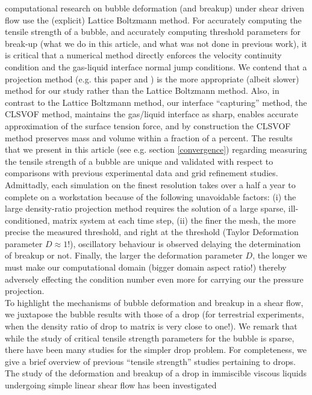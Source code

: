 \documentclass{elsarticle}
\begin{document}
{computational research on bubble deformation (and breakup) under shear driven 
flow\cite{WeiQiaXu12,WanShiZha15,AAMM-16-2}  use the (explicit) Lattice Boltzmann method.  For accurately computing the tensile strength of a bubble, and accurately computing threshold parameters for break-up (what we do in this article, and what was not done in previous work), it is critical that a numerical method directly enforces the velocity continuity condition and the gas-liquid interface normal jump conditions.  We contend that a projection method (e.g. this paper and \cite{zhang2021three,zhang2022three,OhtSus12}) is the more appropriate (albeit slower) method for our study rather than the Lattice Boltzmann method.  Also, in contrast to the Lattice Boltzmann method, our interface ``capturing'' method, the CLSVOF method\cite{SusPuc00,SusSmiHusOhtZhi07},  maintains the gas/liquid interface as sharp, enables accurate approximation of the surface tension force,  and by construction the CLSVOF method preserves mass and volume within a fraction of a percent. The results that we present in this article (see e.g. section \ref{convergence}) regarding measuring the tensile strength of a bubble are unique and validated with respect to comparisons with previous experimental data and grid refinement studies.  Admittadly, each simulation on the finest resolution takes over a half a year to complete on a workstation because of the following unavoidable factors: (i) the large density-ratio projection method requires the solution of a large sparse, ill-conditioned, matrix system at each time step, (ii) the finer the mesh, the more precise the measured threshold, and right at the threshold (Taylor Deformation parameter $D\approx 1$!), oscillatory behaviour is observed delaying the determination of breakup or not.  Finally, the larger the deformation parameter $D$, the longer we must make our computational domain (bigger domain aspect ratio!) thereby adversely effecting the condition number even more for carrying our the pressure projection. \\ \indent
%
To highlight the mechanisms of bubble deformation and breakup in a shear flow, we juxtapose the bubble results with those of a drop (for terrestrial experiments, when the density ratio of drop to matrix is very close to one!).
We remark that while the study of critical tensile strength parameters for the bubble is sparse, there have been many studies for the 
simpler drop problem. For completeness, we give a brief overview of previous ``tensile strength'' studies pertaining to drops.
%
The study of the deformation and breakup of a drop in immiscible viscous liquids undergoing simple linear shear flow has been investigated 
}
\end{document}

